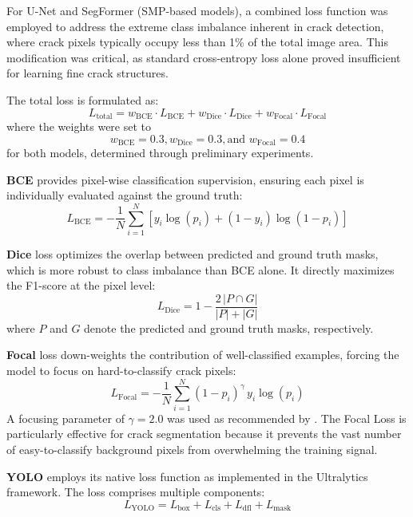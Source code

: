 \hs For U-Net and SegFormer (SMP-based models), a combined loss function was employed to address the extreme class imbalance inherent in crack detection, where crack pixels typically occupy less than 1\% of the total image area. This modification was critical, as standard cross-entropy loss alone proved insufficient for learning fine crack structures.

The total loss is formulated as:
\begin{equation}
    L_{\text{total}} = w_{\text{BCE}} \cdot L_{\text{BCE}} + w_{\text{Dice}} \cdot L_{\text{Dice}} + w_{\text{Focal}} \cdot L_{\text{Focal}}
\end{equation}
where the weights were set to \[w_{\text{BCE}} = 0.3, w_{\text{Dice}} = 0.3, \text{and } w_{\text{Focal}} = 0.4\] for both models, determined through preliminary experiments.

\hs \textbf{BCE} provides pixel-wise classification supervision, ensuring each pixel is individually evaluated against the ground truth:
\begin{equation}
    L_{\text{BCE}} = -\frac{1}{N} \sum_{i=1}^{N} \left[ y_i \log(p_i) + (1 - y_i) \log(1 - p_i) \right]
\end{equation}

\hs \textbf{Dice} loss optimizes the overlap between predicted and ground truth masks, which is more robust to class imbalance than BCE alone. It directly maximizes the F1-score at the pixel level:
\begin{equation}
    L_{\text{Dice}} = 1 - \frac{2 \, |P \cap G|}{|P| + |G|}
\end{equation}
where $P$ and $G$ denote the predicted and ground truth masks, respectively.

\hs \textbf{Focal} loss \cite{29-lin-2017-focal-loss} down-weights the contribution of well-classified examples, forcing the model to focus on hard-to-classify crack pixels:
\begin{equation}
    L_{\text{Focal}} = -\frac{1}{N} \sum_{i=1}^{N} (1 - p_i)^{\gamma} \, y_i \log(p_i)
\end{equation}
\hs A focusing parameter of $\gamma = 2.0$ was used as recommended by \cite{29-lin-2017-focal-loss}. The Focal Loss is particularly effective for crack segmentation because it prevents the vast number of easy-to-classify background pixels from overwhelming the training signal.

\hs \textbf{YOLO} employs its native loss function as implemented in the Ultralytics framework. The loss comprises multiple components:
\begin{equation}
    L_{\text{YOLO}} = L_{\text{box}} + L_{\text{cls}} + L_{\text{dfl}} + L_{\text{mask}}
\end{equation}

